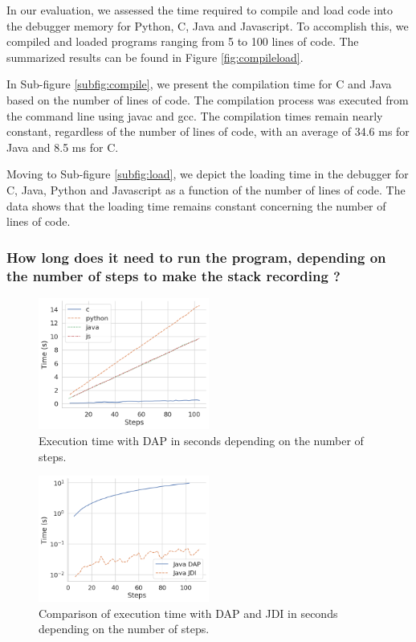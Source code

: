 \documentclass[english,submission]{programming}
\begin{document}
In our evaluation, we assessed the time required to compile and load code into the debugger memory for Python, C, Java and Javascript. 
To accomplish this, we compiled and loaded programs ranging from 5 to 100 lines of code. 
The summarized results can be found in Figure \ref{fig:compileload}.

In Sub-figure \ref{subfig:compile}, we present the compilation time for C and Java based on the number of lines of code. 
The compilation process was executed from the command line using javac and gcc. 
The compilation times remain nearly constant, regardless of the number of lines of code, with an average of 34.6 ms for Java and 8.5 ms for C.

Moving to Sub-figure \ref{subfig:load}, we depict the loading time in the debugger for C, Java, Python and Javascript as a function of the number of lines of code. 
The data shows that the loading time remains constant concerning the number of lines of code. 

\subsubsection{How long does it need to run the program, depending on the number of steps to make the stack recording ?}

\begin{figure}[htbp]
  \centering
  \includegraphics[width=0.5\textwidth]{img/execute.png}
  \caption{Execution time with DAP in seconds depending on the number of steps.}
  \label{fig:execute-time}
\end{figure}

\begin{figure}[htbp]
  \centering
  \includegraphics[width=0.5\textwidth]{img/execute_java_jdi.png}
  \caption{Comparison of execution time with DAP and JDI in seconds depending on the number of steps.}
  \label{fig:execute-java-jdi}
\end{figure}
\end{document}
